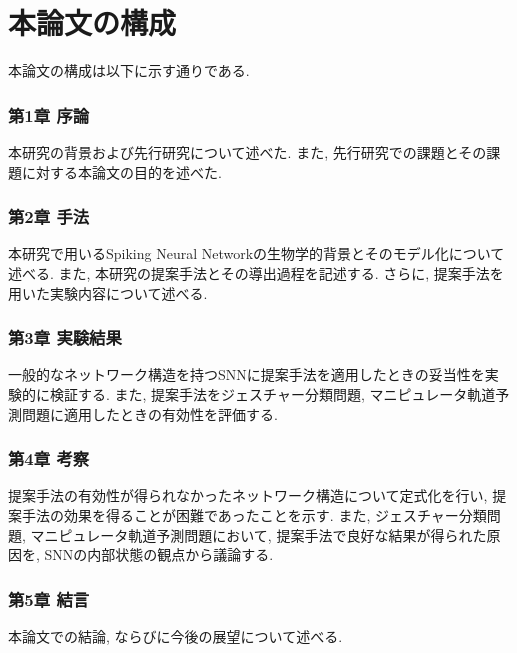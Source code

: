 \section{本論文の構成}
本論文の構成は以下に示す通りである.

\subsubsection{第1章 序論}
本研究の背景および先行研究について述べた.
また, 先行研究での課題とその課題に対する本論文の目的を述べた.

\subsubsection{第2章 手法}
本研究で用いるSpiking Neural Networkの生物学的背景とそのモデル化について述べる.
また, 本研究の提案手法とその導出過程を記述する.
さらに, 提案手法を用いた実験内容について述べる.

\subsubsection{第3章 実験結果}
一般的なネットワーク構造を持つSNNに提案手法を適用したときの妥当性を実験的に検証する.
また, 提案手法をジェスチャー分類問題, マニピュレータ軌道予測問題に適用したときの有効性を評価する.

\subsubsection{第4章 考察}
提案手法の有効性が得られなかったネットワーク構造について定式化を行い, 提案手法の効果を得ることが困難であったことを示す.
また, ジェスチャー分類問題, マニピュレータ軌道予測問題において, 提案手法で良好な結果が得られた原因を, SNNの内部状態の観点から議論する.

\subsubsection{第5章 結言}
本論文での結論, ならびに今後の展望について述べる.
